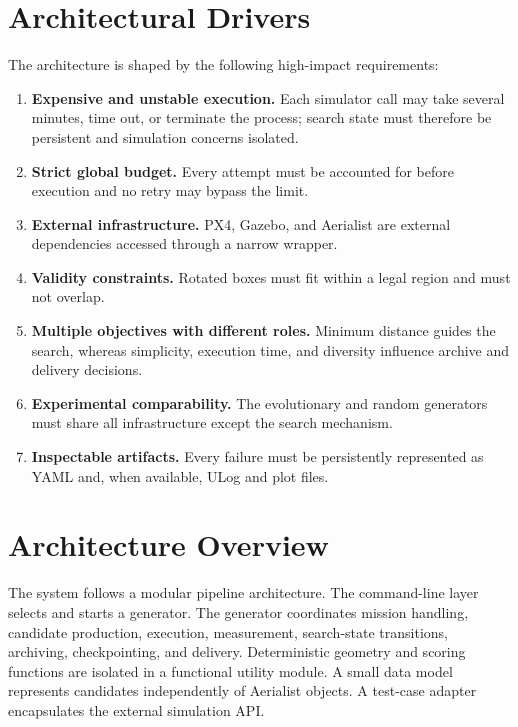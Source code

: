\documentclass[11pt,a4paper]{report}
\begin{document}
\section{Architectural Drivers}
The architecture is shaped by the following high-impact requirements:
\begin{enumerate}
  \item \textbf{Expensive and unstable execution.} Each simulator call may take several minutes, time out, or terminate the process; search state must therefore be persistent and simulation concerns isolated.
  \item \textbf{Strict global budget.} Every attempt must be accounted for before execution and no retry may bypass the limit.
  \item \textbf{External infrastructure.} PX4, Gazebo, and Aerialist are external dependencies accessed through a narrow wrapper.
  \item \textbf{Validity constraints.} Rotated boxes must fit within a legal region and must not overlap.
  \item \textbf{Multiple objectives with different roles.} Minimum distance guides the search, whereas simplicity, execution time, and diversity influence archive and delivery decisions.
  \item \textbf{Experimental comparability.} The evolutionary and random generators must share all infrastructure except the search mechanism.
  \item \textbf{Inspectable artifacts.} Every failure must be persistently represented as YAML and, when available, ULog and plot files.
\end{enumerate}

\section{Architecture Overview}
The system follows a modular pipeline architecture. The command-line layer selects and starts a generator. The generator coordinates mission handling, candidate production, execution, measurement, search-state transitions, archiving, checkpointing, and delivery. Deterministic geometry and scoring functions are isolated in a functional utility module. A small data model represents candidates independently of Aerialist objects. A test-case adapter encapsulates the external simulation API.
\end{document}
